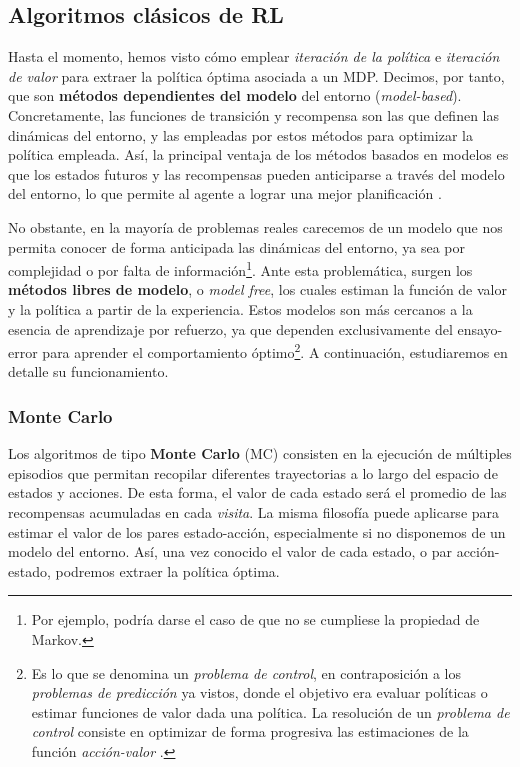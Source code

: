 \subsection{Algoritmos clásicos de RL}

Hasta el momento, hemos visto cómo emplear \textit{iteración de la política} e \textit{iteración de valor} para extraer la política óptima asociada a un MDP. Decimos, por tanto, que son \textbf{métodos dependientes del modelo} del entorno (\textit{model-based}). Concretamente, las funciones de transición y recompensa son las que definen las dinámicas del entorno, y las empleadas por estos métodos para optimizar la política empleada. Así, la principal ventaja de los métodos basados en modelos es que los estados futuros y las recompensas pueden anticiparse a través del modelo del entorno, lo que permite al agente a lograr una mejor planificación \cite{zhang2020taxonomy}.

No obstante, en la mayoría de problemas reales carecemos de un modelo que nos permita conocer de forma anticipada las dinámicas del entorno, ya sea por complejidad o por falta de información\footnote{Por ejemplo, podría darse el caso de que no se cumpliese la propiedad de Markov.}. Ante esta problemática, surgen los \textbf{métodos libres de modelo}, o \textit{model free}, los cuales estiman la función de valor y la política a partir de la experiencia. Estos modelos son más cercanos a la esencia de aprendizaje por refuerzo, ya que dependen exclusivamente del ensayo-error para aprender el comportamiento óptimo\footnote{Es lo que se denomina un \textit{problema de control}, en contraposición a los \textit{problemas de predicción} ya vistos, donde el objetivo era evaluar políticas o estimar funciones de valor dada una política. La resolución de un \textit{problema de control} consiste en optimizar de forma progresiva las estimaciones de la función \textit{acción-valor} \cite{morales2020grokking}.}. A continuación, estudiaremos en detalle su funcionamiento.

\subsubsection{Monte Carlo}

Los algoritmos de tipo \textbf{Monte Carlo} (MC) consisten en la ejecución de múltiples episodios que permitan recopilar diferentes trayectorias a lo largo del espacio de estados y acciones. De esta forma, el valor de cada estado será el promedio de las recompensas acumuladas en cada \textit{visita}. La misma filosofía puede aplicarse para estimar el valor de los pares estado-acción, especialmente si no disponemos de un modelo del entorno. Así, una vez conocido el valor de cada estado, o par acción-estado, podremos extraer la política óptima.

